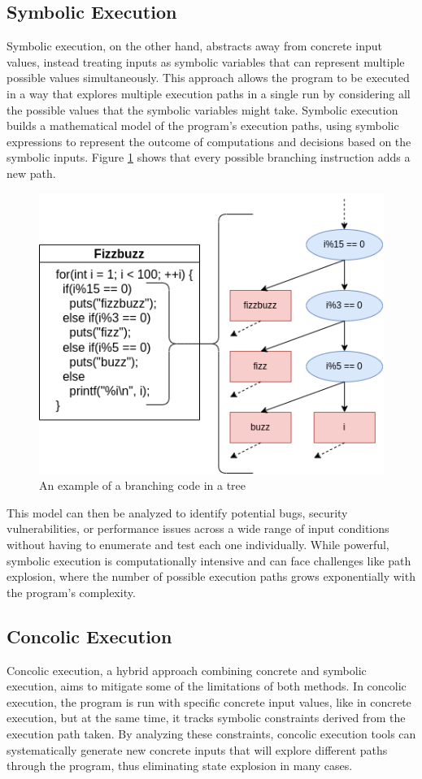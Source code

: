 \subsection{Symbolic Execution}
Symbolic execution, on the other hand, abstracts away from concrete input values, instead treating inputs as symbolic variables that can represent multiple possible values simultaneously. 
This approach allows the program to be executed in a way that explores multiple execution paths in a single run by considering all the possible values that the symbolic variables might take. 
Symbolic execution builds a mathematical model of the program's execution paths, using symbolic expressions to represent the outcome of computations and decisions based on the symbolic inputs. 
Figure \ref{fig:sym_tree} shows that every possible branching instruction adds a new path.
\begin{figure}[ht]
    \centering
    \includegraphics[width=0.8\linewidth]{figures/sym_trans}
    \caption[Branching in symbolic execution]{An example of a branching code in a tree}
    \label{fig:sym_tree}
\end{figure}

This model can then be analyzed to identify potential bugs, security vulnerabilities, or performance issues across a wide range of input conditions without having to enumerate and test each one individually. 
While powerful, symbolic execution is computationally intensive and can face challenges like path explosion, where the number of possible execution paths grows exponentially with the program's complexity.

\subsection{Concolic Execution} 
Concolic execution, a hybrid approach combining concrete and symbolic execution, aims to mitigate some of the limitations of both methods. 
In concolic execution, the program is run with specific concrete input values, like in concrete execution, but at the same time, it tracks symbolic constraints derived from the execution path taken. 
By analyzing these constraints, concolic execution tools can systematically generate new concrete inputs that will explore different paths through the program, thus eliminating state explosion in many cases.

